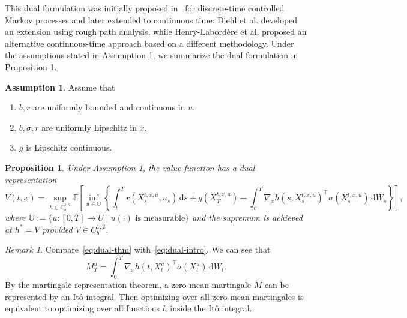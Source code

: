 \documentclass[11pt]{article}
\numberwithin{equation}{section}
\theoremstyle{plain}
\newtheorem{proposition}[theorem]{Proposition}
\theoremstyle{definition}
\newtheorem{assumption}{Assumption}
\theoremstyle{remark}
\newtheorem{remark}[theorem]{Remark}
\newcommand{\bE}{\mathbb{E}}
\newcommand{\dd}{\mathrm{d}}
\begin{document}
This dual formulation was initially proposed in~\cite{rogers2007pathwise} for discrete-time controlled Markov processes and later extended to continuous time: Diehl et al. \cite{diehl2017stochastic} developed an extension using rough path analysis, while Henry-Labord\`{e}re et al. \cite{henry2016dual} proposed an alternative continuous-time approach based on a different methodology. Under the assumptions stated in Assumption \ref{assu:dual-sc-prob}, we summarize the dual formulation in Proposition \ref{prop:dual-formulation-sc}. 

\begin{assumption} \label{assu:dual-sc-prob}
    Assume that 
    \begin{enumerate}
        \item $b, r$ are uniformly bounded and continuous in $u$. 
        \item $b, \sigma, r$ are uniformly Lipschitz in $x$. 
        \item $g$ is Lipschitz continuous. 
    \end{enumerate}
\end{assumption}

\begin{proposition} \label{prop:dual-formulation-sc}
Under Assumption \ref{assu:dual-sc-prob}, the value function has a dual representation 
\begin{equation} \label{eq:dual-thm}
    V(t, x) = \sup_{h\in C_b^{1,2}}\bE\left[ \inf_{u \in \mathbb{U}} \left\{ \int_t^T r(X_s^{t, x, u}, u_s)\,\dd s + g(X_T^{t,x,u}) - \int_t^T \nabla_x h(s, X_s^{t,x,u})^\top \sigma(X_s^{t,x,u})\,\dd W_s \right\} \right],
\end{equation}
where $\mathbb{U}:= \{u:[0,T]\to U\mid u(\cdot)\text{ is measurable}\}$ and the supremum is achieved at $h^* = V$ provided $V\in C_b^{1,2}$. 
\end{proposition}

\begin{remark}
Compare~\eqref{eq:dual-thm} with~\eqref{eq:dual-intro}. We can see that 
\begin{equation*}
    M_T^u = \int_0^T \nabla_x h(t, X_t^u)^\top \sigma(X_t^u)\,\dd W_t. 
\end{equation*}
By the martingale representation theorem, a zero-mean martingale $M$ can be represented by an It\^{o} integral. Then optimizing over all zero-mean martingales is equivalent to optimizing over all functions $h$ inside the It\^{o} integral. 
\end{remark}
\end{document}
